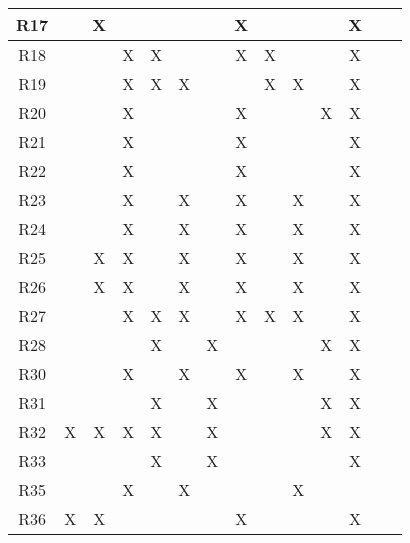 \begin{table}[H]
\begin{tabular}{|c|c|c|c|c|c|c|c|c|c|c|c|c|c|}
\hline
{\cellcolor[rgb]{0.71,0.102,0}}R17 &    & X  &    &    &    &    & X  &    &    &      & X   &      \\ 
\hline
{\cellcolor[rgb]{0.71,0.102,0}}R18 &    &    & X  & X  &    &    & X  & X  &    &      & X   &      \\ 
\hline
{\cellcolor[rgb]{0.71,0.102,0}}R19 &    &    & X  & X  & X  &    &    & X  & X  &      & X   &      \\ 
\hline
{\cellcolor[rgb]{0.71,0.102,0}}R20 &    &    & X  &    &    &    & X  &    &    & X    & X   &      \\ 
\hline
{\cellcolor[rgb]{0.71,0.102,0}}R21 &    &    & X  &    &    &    & X  &    &    &      & X   &      \\ 
\hline
{\cellcolor[rgb]{0.71,0.102,0}}R22 &    &    & X  &    &    &    & X  &    &    &      & X   &      \\ 
\hline
{\cellcolor[rgb]{0.71,0.102,0}}R23 &    &    & X  &    & X  &    & X  &    & X  &      & X   &      \\ 
\hline
{\cellcolor[rgb]{0.71,0.102,0}}R24 &    &    & X  &    & X  &    & X  &    & X  &      & X   &      \\ 
\hline
{\cellcolor[rgb]{0.71,0.102,0}}R25 &    & X  & X  &    & X  &    & X  &    & X  &      & X   &      \\ 
\hline
{\cellcolor[rgb]{0.71,0.102,0}}R26 &    & X  & X  &    & X  &    & X  &    & X  &      & X   &      \\ 
\hline
{\cellcolor[rgb]{0.71,0.102,0}}R27 &    &    & X  & X  & X  &    & X  & X  & X  &      & X   &      \\ 
\hline
{\cellcolor[rgb]{0.71,0.102,0}}R28 &    &    &    & X  &    & X  &    &    &    & X    & X   &      \\ 
\hline
{\cellcolor[rgb]{0.71,0.102,0}}R30 &    &    & X  &    & X  &    & X  &    & X  &      & X   &      \\ 
\hline
{\cellcolor[rgb]{0.71,0.102,0}}R31 &    &    &    & X  &    & X  &    &    &    & X    & X   &      \\ 
\hline
{\cellcolor[rgb]{0.71,0.102,0}}R32 & X  & X  & X  & X  &    & X  &    &    &    & X    & X   &      \\ 
\hline
{\cellcolor[rgb]{0.71,0.102,0}}R33 &    &    &    & X  &    & X  &    &    &    &      & X   &      \\ 
\hline
{\cellcolor[rgb]{0.71,0.102,0}}R35 &    &    & X  &    & X  &    &    &    & X  &      &     &      \\ 
\hline
{\cellcolor[rgb]{0.71,0.102,0}}R36 & X  & X  &    &    &    &    & X  &    &    &      & X   &      \\
\hline
\end{tabular}
\end{table}
\newpage

